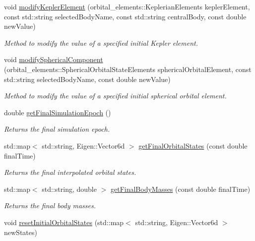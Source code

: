 \begin{DoxyCompactItemize}
void \hyperlink{structtudat_1_1optimization_1_1MissionSegmentSettings_a068451b9141ac549080da867505a3c9d}{modify\+Kepler\+Element} (orbital\+\_\+elements\+::\+Keplerian\+Elements kepler\+Element, const std\+::string selected\+Body\+Name, const std\+::string central\+Body, const double new\+Value)
\begin{DoxyCompactList}\small\item\em Method to modify the value of a specified initial Kepler element. \end{DoxyCompactList}\item 
void \hyperlink{structtudat_1_1optimization_1_1MissionSegmentSettings_a2ca87c8464e7aa25098884898e65cb42}{modify\+Spherical\+Component} (orbital\+\_\+elements\+::\+Spherical\+Orbital\+State\+Elements spherical\+Orbital\+Element, const std\+::string selected\+Body\+Name, const double new\+Value)
\begin{DoxyCompactList}\small\item\em Method to modify the value of a specified initial spherical orbital element. \end{DoxyCompactList}\item 
double \hyperlink{structtudat_1_1optimization_1_1MissionSegmentSettings_a882af2b7c4897e940b840a723274c8c0}{get\+Final\+Simulation\+Epoch} ()
\begin{DoxyCompactList}\small\item\em Returns the final simulation epoch. \end{DoxyCompactList}\item 
std\+::map$<$ std\+::string, Eigen\+::\+Vector6d $>$ \hyperlink{structtudat_1_1optimization_1_1MissionSegmentSettings_ab575fb0d094a8c8562f772570cdae41c}{get\+Final\+Orbital\+States} (const double final\+Time)
\begin{DoxyCompactList}\small\item\em Returns the final interpolated orbital states. \end{DoxyCompactList}\item 
std\+::map$<$ std\+::string, double $>$ \hyperlink{structtudat_1_1optimization_1_1MissionSegmentSettings_ae8ddf559d8bd4fe45ab3aec4508a91b3}{get\+Final\+Body\+Masses} (const double final\+Time)
\begin{DoxyCompactList}\small\item\em Returns the final body masses. \end{DoxyCompactList}\item 
void \hyperlink{structtudat_1_1optimization_1_1MissionSegmentSettings_a99d3514bd38a195b02e42e00cc173ee8}{reset\+Initial\+Orbital\+States} (std\+::map$<$ std\+::string, Eigen\+::\+Vector6d $>$ new\+States)

\end{DoxyCompactItemize}
